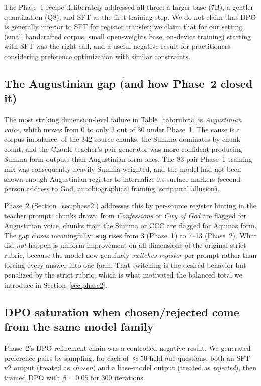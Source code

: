 The Phase~1 recipe deliberately addressed all three: a larger base
(7B), a gentler quantization (Q8), and SFT as the first training step.
We do not claim that DPO is generally inferior to SFT for register
transfer; we claim that for our setting (small handcrafted corpus,
small open-weights base, on-device training) starting with SFT was
the right call, and a useful negative result for practitioners
considering preference optimization with similar constraints.

\subsection{The Augustinian gap (and how Phase~2 closed it)}
\label{sec:augustinian-gap}

The most striking dimension-level failure in Table~\ref{tab:rubric} is
\emph{Augustinian voice}, which moves from 0 to only 3 out of 30 under
Phase~1. The cause is a corpus imbalance: of the 342 source chunks,
the Summa dominates by chunk count, and the Claude teacher's pair
generator was more confident producing Summa-form outputs than
Augustinian-form ones. The 83-pair Phase~1 training mix was
consequently heavily Summa-weighted, and the model had not been shown
enough Augustinian register to internalize its surface markers
(second-person address to God, autobiographical framing, scriptural
allusion).

Phase~2 (Section~\ref{sec:phase2}) addresses this by per-source
register hinting in the teacher prompt: chunks drawn from
\emph{Confessions} or \emph{City of God} are flagged for Augustinian
voice, chunks from the Summa or CCC are flagged for Aquinas form. The
gap closes meaningfully: \texttt{aug} rises from 3 (Phase~1) to 7--13
(Phase~2). What did \emph{not} happen is uniform improvement on all
dimensions of the original strict rubric, because the model now
genuinely \emph{switches register} per prompt rather than forcing every
answer into one form. That switching is the desired behavior but
penalized by the strict rubric, which is what motivated the balanced
total we introduce in Section~\ref{sec:phase2}.

\subsection{DPO saturation when chosen/rejected come from the same model family}
\label{sec:dpo-saturation}

Phase~2's DPO refinement chain was a controlled negative result. We
generated preference pairs by sampling, for each of $\approx$50
held-out questions, both an SFT-v2 output (treated as \emph{chosen})
and a base-model output (treated as \emph{rejected}), then trained DPO
with $\beta=0.05$ for 300 iterations.

